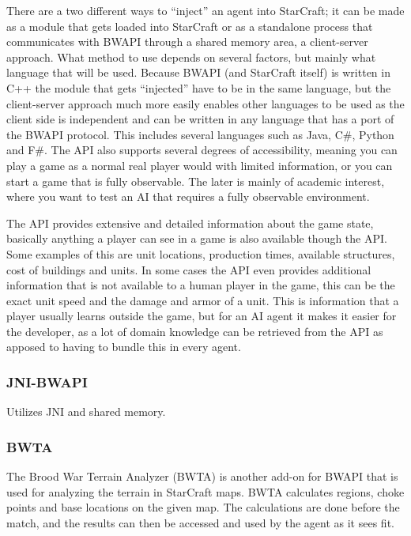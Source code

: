 There are a two different ways to ``inject'' an agent into StarCraft; it can be
made as a module that gets loaded into StarCraft or as a standalone process that
communicates with BWAPI through a shared memory area, a client-server approach.
What method to use depends on several factors, but mainly what language that
will be used. Because BWAPI (and StarCraft itself) is written in C++ the module
that gets ``injected'' have to be in the same language, but the client-server
approach much more easily enables other languages to be used as the client side
is independent and can be written in any language that has a port of the BWAPI
protocol. This includes several languages such as Java, C\#, Python and F\#.
The API also supports several degrees of accessibility, meaning you can play a
game as a normal real player would with limited information, or you can start a
game that is fully observable. The later is mainly of academic interest, where
you want to test an AI that requires a fully observable environment.

The API provides extensive and detailed information about the game state,
basically anything a player can see in a game is also available though the API.
Some examples of this are unit locations, production times, available
structures, cost of buildings and units. In some cases the API even provides
additional information that is not available to a human player in the game, this
can be the exact unit speed and the damage and armor of a unit. This is
information that a player usually learns outside the game, but for an AI agent
it makes it easier for the developer, as a lot of domain knowledge can be
retrieved from the API as apposed to having to bundle this in every agent. 

\subsubsection{JNI-BWAPI}
Utilizes JNI and shared memory.

\subsubsection{BWTA}
The Brood War Terrain Analyzer (BWTA)\cite{bwta} is another add-on for BWAPI
that is used for analyzing the terrain in StarCraft maps. BWTA calculates
regions, choke points and base locations on the given map. The calculations are
done before the match, and the results can then be accessed and used by the
agent as it sees fit.